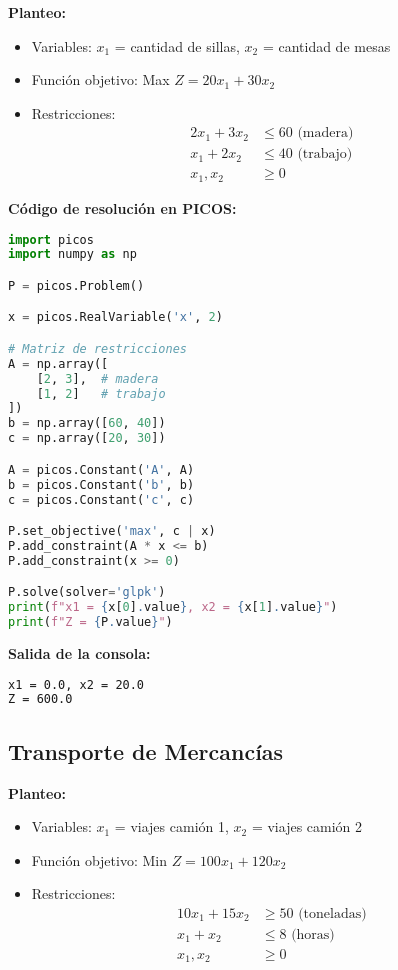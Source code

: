 \documentclass[12pt]{article}
\begin{document}
\textbf{Planteo:}
\begin{itemize}
\item Variables: $x_1$ = cantidad de sillas, $x_2$ = cantidad de mesas
\item Función objetivo: Max $Z = 20x_1 + 30x_2$
\item Restricciones:
  \begin{align*}
  2x_1 + 3x_2 &\leq 60 \text{ (madera)} \\
  x_1 + 2x_2 &\leq 40 \text{ (trabajo)} \\
  x_1, x_2 &\geq 0
  \end{align*}
\end{itemize}

\textbf{Código de resolución en PICOS:}
\begin{lstlisting}[language=Python]
import picos
import numpy as np

P = picos.Problem()

x = picos.RealVariable('x', 2)

# Matriz de restricciones
A = np.array([
    [2, 3],  # madera
    [1, 2]   # trabajo
])
b = np.array([60, 40])
c = np.array([20, 30])

A = picos.Constant('A', A)
b = picos.Constant('b', b)
c = picos.Constant('c', c)

P.set_objective('max', c | x)
P.add_constraint(A * x <= b)
P.add_constraint(x >= 0)

P.solve(solver='glpk')
print(f"x1 = {x[0].value}, x2 = {x[1].value}")
print(f"Z = {P.value}")
\end{lstlisting}

\textbf{Salida de la consola:}
\begin{lstlisting}[language=bash,backgroundcolor=\color{black},basicstyle=\color{white}\ttfamily,numbers=none]
x1 = 0.0, x2 = 20.0
Z = 600.0
\end{lstlisting}

\subsection{Transporte de Mercancías}

\textbf{Planteo:}
\begin{itemize}
\item Variables: $x_1$ = viajes camión 1, $x_2$ = viajes camión 2
\item Función objetivo: Min $Z = 100x_1 + 120x_2$
\item Restricciones:
  \begin{align*}
  10x_1 + 15x_2 &\geq 50 \text{ (toneladas)} \\
  x_1 + x_2 &\leq 8 \text{ (horas)} \\
  x_1, x_2 &\geq 0
  \end{align*}
\end{itemize}
\end{document}
